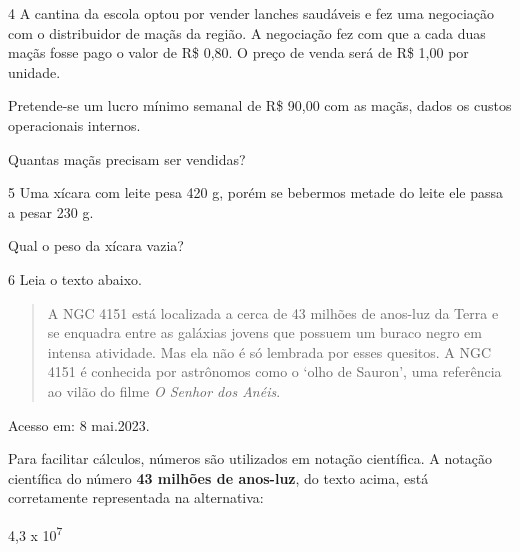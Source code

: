 \begin{escolha}
{\num{4} A cantina da escola optou por vender lanches saudáveis e fez uma
negociação com o distribuidor de maçãs da região. A negociação fez com
que a cada duas maçãs fosse pago o valor de R\$ 0,80. O preço
de venda será de R\$ 1,00 por unidade.

Pretende-se um lucro mínimo semanal de R\$ 90,00 com as maçãs, dados os
custos operacionais internos.

Quantas maçãs precisam ser vendidas?


\num{5} Uma xícara com leite pesa 420 g, porém se bebermos metade do
leite ele passa a pesar 230 g.

Qual o peso da xícara vazia?


\num{6} Leia o texto abaixo.

\begin{quote}
A NGC 4151 está localizada a cerca de 43 milhões de anos-luz
da Terra e se enquadra entre as galáxias jovens que possuem um buraco
negro em intensa atividade. Mas ela não é só lembrada por esses
quesitos. A NGC 4151 é conhecida por astrônomos como o `olho de Sauron',
uma referência ao vilão do filme \textit{O Senhor dos Anéis}.
\end{quote}

Acesso em: 8 mai.2023.}

Para facilitar cálculos, números são utilizados em notação científica.
A notação científica do número \textbf{43 milhões de anos-luz}, do texto 
acima, está corretamente representada na alternativa:

\begin{escolha}

  \item 4,3 x 10\textsuperscript{7}


\end{escolha}
\end{escolha}
